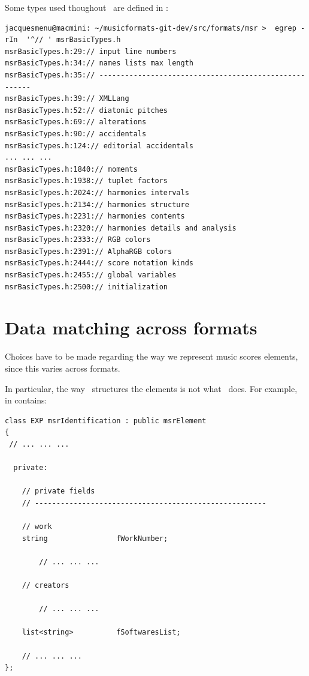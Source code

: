 Some types used thoughout \msrRepr\ are defined in :%
\begin{lstlisting}[language=Terminal]
jacquesmenu@macmini: ~/musicformats-git-dev/src/formats/msr >  egrep -rIn  '^// ' msrBasicTypes.h
msrBasicTypes.h:29:// input line numbers
msrBasicTypes.h:34:// names lists max length
msrBasicTypes.h:35:// ------------------------------------------------------
msrBasicTypes.h:39:// XMLLang
msrBasicTypes.h:52:// diatonic pitches
msrBasicTypes.h:69:// alterations
msrBasicTypes.h:90:// accidentals
msrBasicTypes.h:124:// editorial accidentals
... ... ...
msrBasicTypes.h:1840:// moments
msrBasicTypes.h:1938:// tuplet factors
msrBasicTypes.h:2024:// harmonies intervals
msrBasicTypes.h:2134:// harmonies structure
msrBasicTypes.h:2231:// harmonies contents
msrBasicTypes.h:2320:// harmonies details and analysis
msrBasicTypes.h:2333:// RGB colors
msrBasicTypes.h:2391:// AlphaRGB colors
msrBasicTypes.h:2444:// score notation kinds
msrBasicTypes.h:2455:// global variables
msrBasicTypes.h:2500:// initialization
\end{lstlisting}


\section{Data matching across formats}\label{Data matching across formats}

Choices have to be made regarding the way we represent music scores elements, since this varies across formats.

In particular, the way \mxml\ structures the elements is not what \msrRepr\ does. For example,  in  contains:
\begin{lstlisting}[language=CPlusPlus]
class EXP msrIdentification : public msrElement
{
 // ... ... ...

  private:

    // private fields
    // ------------------------------------------------------

    // work
    string                fWorkNumber;

		// ... ... ...

    // creators

		// ... ... ...

    list<string>          fSoftwaresList;

	// ... ... ...
};
\end{lstlisting}

